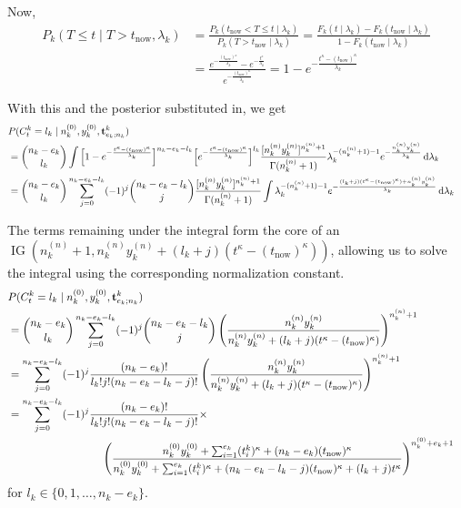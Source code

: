 \documentclass[12pt,a4paper,fleqn]{narms}
\newcommand{\dd}{\,\mathrm{d}}
\newcommand{\mbf}[1]{\mathbf{#1}}
\newcommand{\uz}{^{(0)}} %
\newcommand{\un}{^{(n)}} %
\newcommand{\ig}{\operatorname{IG}}   %
\def\ykz{y\uz_k}
\def\ykn{y\un_k}
\def\nkz{n\uz_k}
\def\nkn{n\un_k}
\def\tnow{t_\text{now}}
\begin{document}
Now,
\begin{align}
P_k(T \leq t \mid T > \tnow, \lambda_k)
 &= \frac{P_k(\tnow < T \leq t \mid\lambda_k)}{P_k(T > \tnow \mid \lambda_k)}
  = \frac{F_k(t\mid\lambda_k) - F_k(\tnow\mid\lambda_k)}{1-F_k(\tnow\mid\lambda_k)} \\
 &= \frac{e^{-\frac{(\tnow)^\kappa}{\lambda_k}} - e^{-\frac{t^\kappa}{\lambda_k}}}{e^{-\frac{(\tnow)^\kappa}{\lambda_k}}}
  = 1 - e^{-\frac{t^\kappa - (\tnow)^\kappa}{\lambda_k}}
\end{align}

With this and the posterior substituted in, we get
\begin{align}
\lefteqn{P(C^k_t = l_k\mid\nkz,\ykz, \mbf{t}^k_{e_k;n_k})} \\
 &= { n_k - e_k \choose l_k} \int \Big[1 - e^{-\frac{t^\kappa - (\tnow)^\kappa}{\lambda_k}}\Big]^{n_k - e_k - l_k}
                                  \Big[    e^{-\frac{t^\kappa - (\tnow)^\kappa}{\lambda_k}}\Big]^{l_k} %
    \frac{[\nkn\ykn]^{\nkn + 1}}{\Gamma(\nkn+1)} \lambda_k^{-(\nkn + 1) - 1} e^{-\frac{\nkn\ykn}{\lambda_k}} \dd \lambda_k \\
 &= { n_k - e_k \choose l_k} \sum_{j=0}^{n_k-e_k-l_k} (-1)^j { n_k - e_k - l_k \choose j} \frac{[\nkn\ykn]^{\nkn + 1}}{\Gamma(\nkn+1)} 
    \int \lambda_k^{-(\nkn + 1) - 1} e^{-\frac{(l_k + j) (t^\kappa - (\tnow)^\kappa) + \nkn\ykn}{\lambda_k}} \dd \lambda_k
\end{align}

The terms remaining under the integral form the core of an $\ig(\nkn + 1, \nkn\ykn + (l_k + j) (t^\kappa - (\tnow)^\kappa))$,
allowing us to solve the integral using the corresponding normalization constant.
\begin{align}
\lefteqn{P(C^k_t = l_k\mid\nkz,\ykz, \mbf{t}^k_{e_k;n_k})} \\
 &= { n_k - e_k \choose l_k} \sum_{j=0}^{n_k-e_k-l_k} (-1)^j { n_k - e_k - l_k \choose j}
    \left(\frac{\nkn\ykn}{\nkn\ykn + (l_k + j) (t^\kappa - (\tnow)^\kappa)}\right)^{\nkn + 1} \\
 &= \sum_{j=0}^{n_k-e_k-l_k} (-1)^j \frac{(n_k - e_k)!}{l_k! j! (n_k - e_k - l_k - j)!}   
    \left(\frac{\nkn\ykn}{\nkn\ykn + (l_k + j) (t^\kappa - (\tnow)^\kappa)}\right)^{\nkn + 1} \\
 &= \sum_{j=0}^{n_k-e_k-l_k} (-1)^j \frac{(n_k - e_k)!}{l_k! j! (n_k - e_k - l_k - j)!} \times \\ & \hspace*{20ex}  
    \left(\frac{\nkz\ykz + \sum_{i=1}^{e_k} (t_i^k)^\kappa + (n_k-e_k) (\tnow)^\kappa }%
               {\nkz\ykz + \sum_{i=1}^{e_k} (t_i^k)^\kappa + (n_k-e_k-l_k-j) (\tnow)^\kappa + (l_k + j) t^\kappa }\right)^{%
    \nkz + e_k + 1} 
\end{align}
for $l_k \in \{0,1,\ldots,n_k-e_k\}$.
\end{document}
